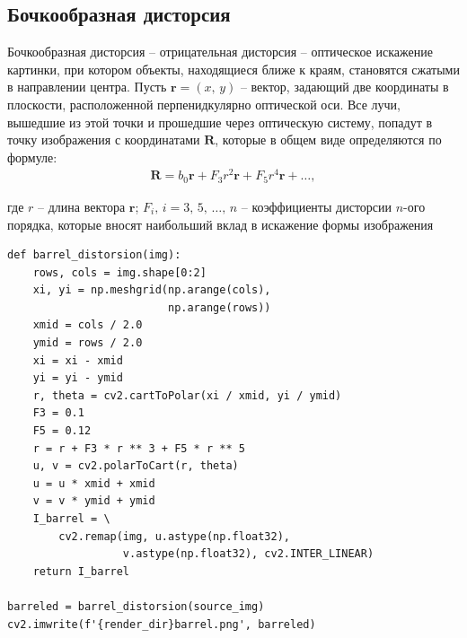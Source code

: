 \documentclass[a4paper, 16pt]{article}
\begin{document}
\newpage
\subsection{Бочкообразная дисторсия}
\noindent Бочкообразная дисторсия -- отрицательная дисторсия --
оптическое искажение картинки, при котором объекты, находящиеся
ближе к краям, становятся сжатыми в направлении центра.
Пусть $\mathbf{r}=\left(x,\,y\right)$ -- вектор, задающий две координаты в плоскости,
расположенной перпенидкулярно оптической оси. Все лучи, вышедшие из этой точки и
прошедшие через оптическую систему, попадут в точку изображения с координатами $\mathbf{R}$,
которые в общем виде определяются по формуле:
\begin{align*}
    \mathbf{R}=b_0\mathbf{r}+F_3r^2\mathbf{r}+F_5r^4\mathbf{r}+\hdots,
\end{align*}


\noindent где $r$ -- длина вектора $\mathbf{r}$; $F_i,\,i=3,\,5,\,\hdots,\,n$ -- коэффициенты
дисторсии $n$-ого порядка, которые вносят наибольший вклад в искажение формы изображения


\begin{lstlisting}[label=barrel-code,caption=Код для бочкообразной дисторсии]
def barrel_distorsion(img):
    rows, cols = img.shape[0:2]
    xi, yi = np.meshgrid(np.arange(cols),
                         np.arange(rows))
    xmid = cols / 2.0
    ymid = rows / 2.0
    xi = xi - xmid
    yi = yi - ymid
    r, theta = cv2.cartToPolar(xi / xmid, yi / ymid)
    F3 = 0.1
    F5 = 0.12
    r = r + F3 * r ** 3 + F5 * r ** 5
    u, v = cv2.polarToCart(r, theta)
    u = u * xmid + xmid
    v = v * ymid + ymid
    I_barrel = \
        cv2.remap(img, u.astype(np.float32),
                  v.astype(np.float32), cv2.INTER_LINEAR)
    return I_barrel

barreled = barrel_distorsion(source_img)
cv2.imwrite(f'{render_dir}barrel.png', barreled)
\end{lstlisting}
\end{document}
